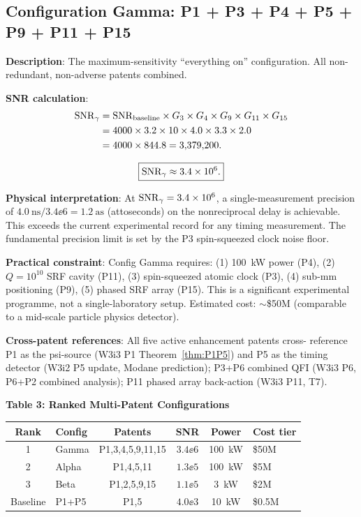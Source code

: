 \subsection{Configuration Gamma: P1 + P3 + P4 + P5 + P9 + P11 + P15}
\label{ssec:config_gamma}

\textbf{Description}: The maximum-sensitivity ``everything on'' configuration.
All non-redundant, non-adverse patents combined.

\textbf{SNR calculation}:
\begin{align}
\mathrm{SNR}_\gamma &= \mathrm{SNR}_{\rm baseline}
\times G_3 \times G_4 \times G_9 \times G_{11} \times G_{15} \notag\\
&= 4000 \times 3.2 \times 10 \times 4.0 \times 3.3 \times 2.0 \notag\\
&= 4000 \times 844.8 = 3{,}379{,}200.
\label{eq:SNR_gamma}
\end{align}

\begin{equation}
\boxed{\mathrm{SNR}_\gamma \approx 3.4\times 10^{6}.}
\label{eq:SNR_gamma_box}
\end{equation}

\textbf{Physical interpretation}: At $\mathrm{SNR}_\gamma = 3.4\times 10^{6}$, a
single-measurement precision of $4.0~\text{ns}/3.4\ee{6} = 1.2~\text{as}$
(attoseconds) on the nonreciprocal delay is achievable. This exceeds the
current experimental record for any timing measurement. The fundamental
precision limit is set by the P3 spin-squeezed clock noise floor.

\textbf{Practical constraint}: Config Gamma requires:
(1) 100~kW power (P4), (2) $Q = 10^{10}$ SRF cavity (P11), (3) spin-squeezed
atomic clock (P3), (4) sub-mm positioning (P9), (5) phased SRF array (P15).
This is a significant experimental programme, not a single-laboratory setup.
Estimated cost: $\sim$\$50M (comparable to a mid-scale particle physics
detector).

\textbf{Cross-patent references}: All five active enhancement patents cross-
reference P1 as the psi-source (W3i3 P1 Theorem~\ref{thm:P1P5}) and P5
as the timing detector (W3i2 P5 update, Modane prediction);
P3+P6 combined QFI (W3i3 P6, P6+P2 combined analysis);
P11 phased array back-action (W3i3 P11, T7).

\begin{center}
\textbf{Table 3: Ranked Multi-Patent Configurations}
\vspace{0.5em}

\begin{tabular}{@{}clcccl@{}}
\toprule
\textbf{Rank} & \textbf{Config} & \textbf{Patents} & \textbf{SNR} & \textbf{Power} & \textbf{Cost tier} \\
\midrule
1 & Gamma & P1,3,4,5,9,11,15 & $3.4\ee{6}$ & 100~kW & \$50M \\
2 & Alpha & P1,4,5,11         & $1.3\ee{5}$ & 100~kW & \$5M \\
3 & Beta  & P1,2,5,9,15       & $1.1\ee{5}$ & 3~kW   & \$2M \\
\midrule
Baseline & P1+P5 & P1,5 & $4.0\ee{3}$ & 10~kW & \$0.5M \\
\bottomrule
\end{tabular}
\end{center}

